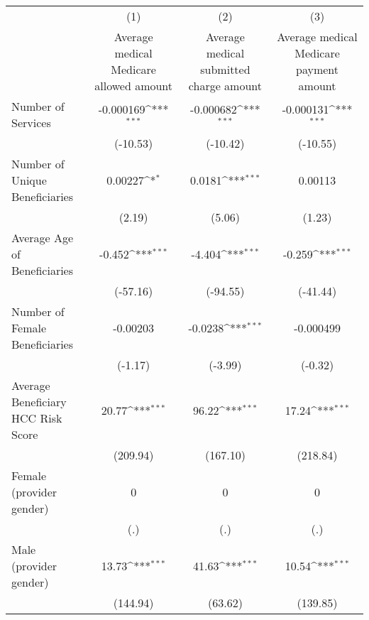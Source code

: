 \def\sym#1{\ifmmode^{#1}\else\(^{#1}\)\fi}
\begin{adjustbox}{max
width={\textwidth},caption={Average Cost per Medical Service over Time, by Provider\label{table:aggregatemed1}},nofloat=table}
\begin{tabular}{l*{3}{c}}
\toprule
                    &\multicolumn{1}{c}{(1)}&\multicolumn{1}{c}{(2)}&\multicolumn{1}{c}{(3)}\\
                    &\multicolumn{1}{c}{Average medical Medicare allowed amount}&\multicolumn{1}{c}{Average medical submitted charge amount}&\multicolumn{1}{c}{Average medical Medicare payment amount}\\
\midrule
Number of Services  &   -0.000169\sym{***}&   -0.000682\sym{***}&   -0.000131\sym{***}\\
                    &    (-10.53)         &    (-10.42)         &    (-10.55)         \\
\addlinespace
Number of Unique Beneficiaries&     0.00227\sym{*}  &      0.0181\sym{***}&     0.00113         \\
                    &      (2.19)         &      (5.06)         &      (1.23)         \\
\addlinespace
Average Age of Beneficiaries&      -0.452\sym{***}&      -4.404\sym{***}&      -0.259\sym{***}\\
                    &    (-57.16)         &    (-94.55)         &    (-41.44)         \\
\addlinespace
Number of Female Beneficiaries&    -0.00203         &     -0.0238\sym{***}&   -0.000499         \\
                    &     (-1.17)         &     (-3.99)         &     (-0.32)         \\
\addlinespace
Average Beneficiary HCC Risk Score&       20.77\sym{***}&       96.22\sym{***}&       17.24\sym{***}\\
                    &    (209.94)         &    (167.10)         &    (218.84)         \\
\addlinespace
Female (provider gender)&           0         &           0         &           0         \\
                    &         (.)         &         (.)         &         (.)         \\
\addlinespace
Male (provider gender)&       13.73\sym{***}&       41.63\sym{***}&       10.54\sym{***}\\
                    &    (144.94)         &     (63.62)         &    (139.85)         \\

\end{tabular}
\end{adjustbox}
